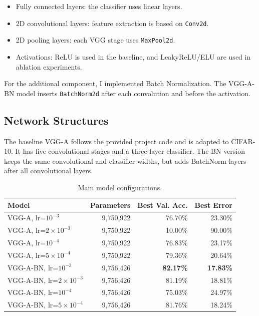 \documentclass[11pt,a4paper]{article}
\begin{document}
\begin{itemize}
    \item Fully connected layers: the classifier uses linear layers.
    \item 2D convolutional layers: feature extraction is based on \texttt{Conv2d}.
    \item 2D pooling layers: each VGG stage uses \texttt{MaxPool2d}.
    \item Activations: ReLU is used in the baseline, and LeakyReLU/ELU are used
    in ablation experiments.
\end{itemize}

For the additional component, I implemented Batch Normalization. The VGG-A-BN
model inserts \texttt{BatchNorm2d} after each convolution and before the
activation.

\subsection{Network Structures}

The baseline VGG-A follows the provided project code and is adapted to CIFAR-10.
It has five convolutional stages and a three-layer classifier. The BN version
keeps the same convolutional and classifier widths, but adds BatchNorm layers
after all convolutional layers.

\begin{table}[H]
\centering
\caption{Main model configurations.}
\begin{tabular}{lrrr}
\toprule
Model & Parameters & Best Val. Acc. & Best Error \\
\midrule
VGG-A, lr=$10^{-3}$ & 9,750,922 & 76.70\% & 23.30\% \\
VGG-A, lr=$2\times10^{-3}$ & 9,750,922 & 10.00\% & 90.00\% \\
VGG-A, lr=$10^{-4}$ & 9,750,922 & 76.83\% & 23.17\% \\
VGG-A, lr=$5\times10^{-4}$ & 9,750,922 & 79.36\% & 20.64\% \\
VGG-A-BN, lr=$10^{-3}$ & 9,756,426 & \textbf{82.17\%} & \textbf{17.83\%} \\
VGG-A-BN, lr=$2\times10^{-3}$ & 9,756,426 & 81.19\% & 18.81\% \\
VGG-A-BN, lr=$10^{-4}$ & 9,756,426 & 75.03\% & 24.97\% \\
VGG-A-BN, lr=$5\times10^{-4}$ & 9,756,426 & 81.76\% & 18.24\% \\
\bottomrule
\end{tabular}
\end{table}
\end{document}

